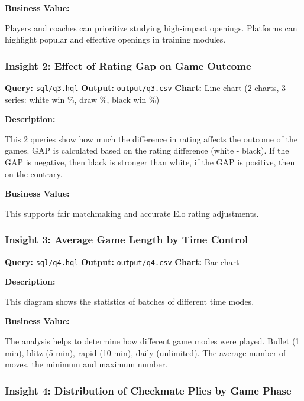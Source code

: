 \documentclass[12pt,a4paper]{article}
\begin{document}
\textbf{Business Value:}

Players and coaches can prioritize studying high-impact openings. Platforms can highlight popular and effective openings in training modules.

\subsubsection{Insight 2: Effect of Rating Gap on Game Outcome}

\textbf{Query:} \texttt{sql/q3.hql}  
\textbf{Output:} \texttt{output/q3.csv}  
\textbf{Chart:} Line chart (2 charts, 3 series: white win \%, draw \%, black win \%)

\textbf{Description:}

This 2 queries show how much the difference in rating affects the outcome of the games. GAP is calculated based on the rating difference (white - black). If the GAP is negative, then black is stronger than white, if the GAP is positive, then on the contrary.

\textbf{Business Value:}

This supports fair matchmaking and accurate Elo rating adjustments.

\subsubsection{Insight 3: Average Game Length by Time Control}

\textbf{Query:} \texttt{sql/q4.hql}  
\textbf{Output:} \texttt{output/q4.csv}  
\textbf{Chart:} Bar chart

\textbf{Description:}

This diagram shows the statistics of batches of different time modes.

\textbf{Business Value:}

The analysis helps to determine how different game modes were played. Bullet (1 min), blitz (5 min), rapid (10 min), daily (unlimited). The average number of moves, the minimum and maximum number.

\subsubsection{Insight 4: Distribution of Checkmate Plies by Game Phase}
\end{document}
